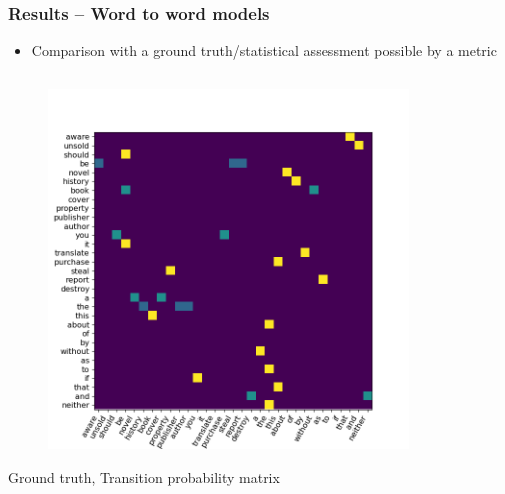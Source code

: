 
\begin{frame}
\frametitle{Results – Word to word models}
	\begin{itemize}
		\item<+-> Comparison with a ground truth/statistical assessment possible by a metric
	\end{itemize}
	\vspace*{-1.5cm}
	\begin{columns}
		\begin{column}{0.33\textwidth}
			\begin{figure}
				\centering
					\includegraphics[height=1.1\columnwidth]{Bilder/BspW2W/plots/OHE_OHE_500E_100BS_1L_1C_5P_30T_J/J_5pages_30T_words.png}
			\end{figure}
			\begin{center}
				{\large Ground truth, Transition probability matrix}
			\end{center}
		\end{column}
		\begin{column}{0.33\textwidth}
			\begin{figure}

\end{figure}
\end{column}
\end{columns}
\end{frame}
